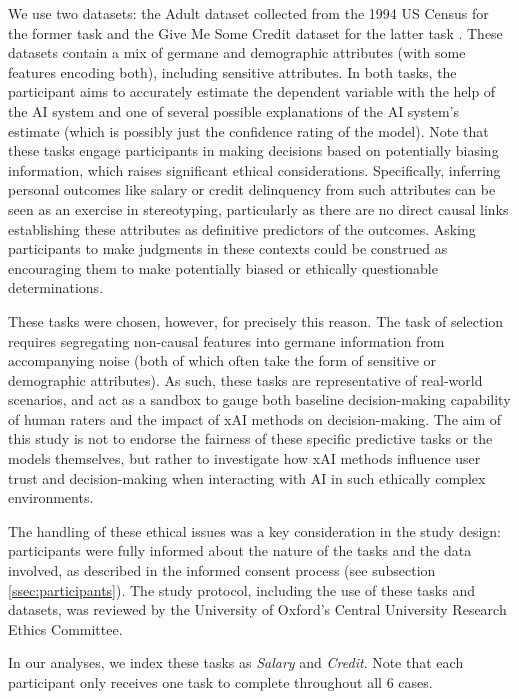 We use two datasets: the Adult dataset collected from the 1994 US Census for the former task and the Give Me Some Credit dataset for the latter task \cite{kohavi_scaling_1996, GiveMeSomeCredit}. These datasets contain a mix of germane and demographic attributes (with some features encoding both), including sensitive attributes. In both tasks, the participant aims to accurately estimate the dependent variable with the help of the AI system and one of several possible explanations of the AI system's estimate (which is possibly just the confidence rating of the model). Note that these tasks engage participants in making decisions based on potentially biasing information, which raises significant ethical considerations. Specifically, inferring personal outcomes like salary or credit delinquency from such attributes can be seen as an exercise in stereotyping, particularly as there are no direct causal links establishing these attributes as definitive predictors of the outcomes. Asking participants to make judgments in these contexts could be construed as encouraging them to make potentially biased or ethically questionable determinations.

These tasks were chosen, however, for precisely this reason. The task of selection requires segregating non-causal features into germane information from accompanying noise (both of which often take the form of sensitive or demographic attributes). As such, these tasks are representative of real-world scenarios, and act as a sandbox to gauge both baseline decision-making capability of human raters and the impact of xAI methods on decision-making. The aim of this study is not to endorse the fairness of these specific predictive tasks or the models themselves, but rather to investigate how xAI methods influence user trust and decision-making when interacting with AI in such ethically complex environments. 

The handling of these ethical issues was a key consideration in the study design: participants were fully informed about the nature of the tasks and the data involved, as described in the informed consent process (see subsection \ref{ssec:participants}). The study protocol, including the use of these tasks and datasets, was reviewed by the University of Oxford's Central University Research Ethics Committee.

In our analyses, we index these tasks as \emph{Salary} and \emph{Credit}. Note that each participant only receives one task to complete throughout all 6 cases.

